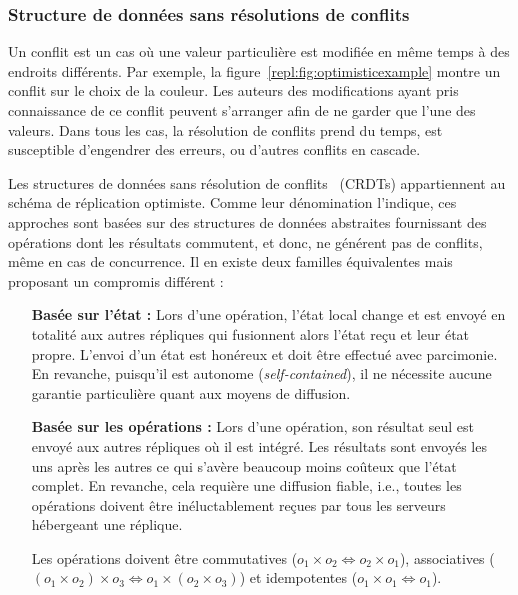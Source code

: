 \subsubsection{Structure de données sans résolutions de conflits}
\label{repl:subsubsec:crdts}

Un conflit est un cas où une valeur particulière est modifiée en même temps à
des endroits différents. Par exemple, la figure~\ref{repl:fig:optimisticexample}
montre un conflit sur le choix de la couleur. Les auteurs des modifications
ayant pris connaissance de ce conflit peuvent s'arranger afin de ne garder que
l'une des valeurs. Dans tous les cas, la résolution de conflits prend du temps,
est susceptible d'engendrer des erreurs, ou d'autres conflits en cascade.

Les structures de données sans résolution de
conflits~\cite{shapiro2011comprehensive} (CRDTs) appartiennent au schéma de
réplication optimiste. Comme leur dénomination l'indique, ces approches sont
basées sur des structures de données abstraites fournissant des opérations dont
les résultats commutent, et donc, ne générent pas de conflits, même en cas de
concurrence.  Il en existe deux familles équivalentes mais proposant un
compromis différent :
\begin{itemize}
\item [\textbf{Basée sur l'état :}] Lors d'une opération, l'état local change et
  est envoyé en totalité aux autres répliques qui fusionnent alors l'état reçu
  et leur état propre. L'envoi d'un état est honéreux et doit être effectué avec
  parcimonie. En revanche, puisqu'il est autonome (\emph{self-contained}), il ne
  nécessite aucune garantie particulière quant aux moyens de diffusion.
\item [\textbf{Basée sur les opérations :}] Lors d'une opération, son résultat
  seul est envoyé aux autres répliques où il est intégré. Les résultats sont
  envoyés les uns après les autres ce qui s'avère beaucoup moins coûteux que
  l'état complet. En revanche, cela requière une diffusion fiable, i.e., toutes
  les opérations doivent être inéluctablement reçues par tous les serveurs
  hébergeant une réplique.

  Les opérations doivent être commutatives
  ($o_1 \times o_2 \Leftrightarrow o_2 \times o_1$), associatives
  ($(o_1 \times o_2) \times o_3 \Leftrightarrow o_1 \times (o_2 \times o_3)$) et
  idempotentes ($o_1 \times o_1 \Leftrightarrow o_1$).
\end{itemize}

